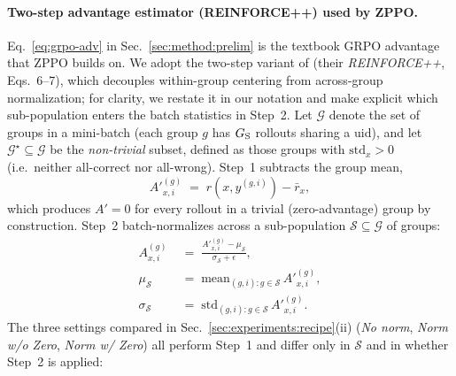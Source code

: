 \documentclass{llmxive}
\begin{document}
\paragraph{Two-step advantage estimator (REINFORCE++) used by ZPPO.}
Eq.~\eqref{eq:grpo-adv} in Sec.~\ref{sec:method:prelim} is the textbook GRPO advantage that ZPPO builds on. We adopt the two-step variant of \citet{hu2025reinforce++} (their \emph{REINFORCE++}, Eqs.~6--7), which decouples within-group centering from across-group normalization; for clarity, we restate it in our notation and make explicit which sub-population enters the batch statistics in Step~2. Let $\mathcal{G}$ denote the set of groups in a mini-batch (each group $g$ has $G_{\rm S}$ rollouts sharing a uid), and let $\mathcal{G}^{\star}\!\subseteq\!\mathcal{G}$ be the \emph{non-trivial} subset, defined as those groups with $\mathrm{std}_x\!>\!0$ (i.e.\ neither all-correct nor all-wrong). Step~1 subtracts the group mean,
\begin{equation}
A'^{(g)}_{x,i} \;=\; r(x, y^{(g,i)}) - \bar{r}_x,
\label{eq:adv-step1}
\end{equation}
which produces $A'\!=\!0$ for every rollout in a trivial (zero-advantage) group by construction. Step~2 batch-normalizes across a sub-population $\mathcal{S}\!\subseteq\!\mathcal{G}$ of groups:
\begin{align}
A^{(g)}_{x,i} &\;=\; \frac{A'^{(g)}_{x,i} - \mu_{\mathcal{S}}}{\sigma_{\mathcal{S}} + \epsilon}, \nonumber \\
\mu_{\mathcal{S}} &\;=\; \mathrm{mean}_{(g,i):g\in\mathcal{S}}\,A'^{(g)}_{x,i}, \nonumber \\
\sigma_{\mathcal{S}} &\;=\; \mathrm{std}_{(g,i):g\in\mathcal{S}}\,A'^{(g)}_{x,i}.
\label{eq:adv-step2}
\end{align}
The three settings compared in Sec.~\ref{sec:experiments:recipe}(ii) (\emph{No norm}, \emph{Norm w/o Zero}, \emph{Norm w/ Zero}) all perform Step~1 and differ only in $\mathcal{S}$ and in whether Step~2 is applied:
\end{document}
